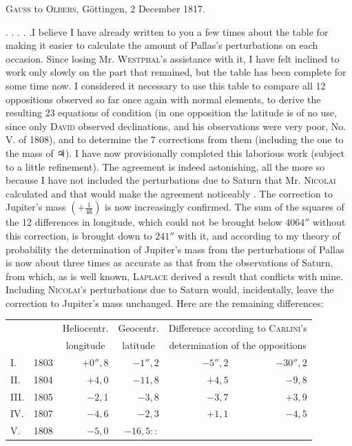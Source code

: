 \par{}\bigskip
\begin{center}
\textsc{Gauss} to \textsc{Olbers}, Göttingen, 2 December 1817.
\end{center}
\noindent\hspace*{\parindent}. . . . .\quad I believe I have already written to you a few times about the table for making it easier to calculate the amount of Pallas's perturbations on each occasion. Since losing Mr. \textsc{Westphal}'s assistance with it, I have felt inclined to work only slowly on the part that remained, but the table has been complete for some time now. I considered it necessary to use this table to compare all 12 oppositions observed so far once again with normal elements, to derive the resulting 23 equations of condition (in one opposition the latitude is of no use, since only \textsc{David} observed declinations, and his observations were very poor, No. V. of 1808), and to determine the 7 corrections from them (including the one to the mass of {\AstroSymbols ♃}). I have now provisionally completed this laborious work (subject to a little refinement). The agreement is indeed astonishing, all the more so because I have not included the perturbations due to Saturn that Mr. \textsc{Nicolai} calculated and that would make the agreement noticeably . The correction to Jupiter's mass \((+\frac{1}{46})\) is now increasingly confirmed. The sum of the squares of the 12 differences in longitude, which could not be brought below \(4064''\) without this correction, is brought down to \(241''\) with it, and according to my theory of probability the determination of Jupiter's mass from the perturbations of Pallas is now about three times as accurate as that from the observations of Saturn, from which, as is well known, \textsc{Laplace} derived a result that conflicts with mine. Including \textsc{Nicolai}'s perturbations due to Saturn would, incidentally, leave the correction to Jupiter's mass unchanged. Here are the remaining differences:
\begin{center}
\begingroup\small\setlength{\tabcolsep}{5pt}
\begin{tabular}{@{}lr r r r r@{}}
&&\multicolumn{1}{c}{Heliocentr.}&\multicolumn{1}{c}{Geocentr.}&\multicolumn{2}{c}{Difference according to \textsc{Carlini}'s}\\
&&\multicolumn{1}{c}{longitude}&\multicolumn{1}{c}{latitude}&\multicolumn{2}{c}{determination of the oppositions}\\[3pt]
I.&1803&\(+0''{,}8\)&\(-1''{,}2\)&\(-5''{,}2\)&\(-30''{,}2\)\\
II.&1804&\(+4{,}0\)&\(-11{,}8\)&\(+4{,}5\)&\(-9{,}8\)\\
III.&1805&\(-2{,}1\)&\(-3{,}8\)&\(-3{,}7\)&\(+3{,}9\)\\
IV.&1807&\(-4{,}6\)&\(-2{,}3\)&\(+1{,}1\)&\(-4{,}5\)\\
V.&1808&\(-5{,}0\)&\(-16{,}5\mathpunct{::}\)&&
\end{tabular}
\endgroup
\end{center}
